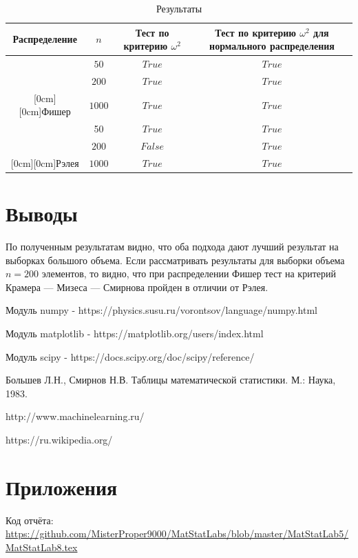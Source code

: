 \documentclass[a4]{article}
\begin{document}
\begin{table}[H]
\caption{Результаты}
\label{tab:my_label1}
\begin{center}
\vspace{5mm}
\begin{tabular}{|c|c|c|c|}
\hline
Распределение & $n$&Тест по критерию $\omega^2$ & Тест по критерию $\omega^2$ для нормального распределения \\
\hline
&$50$&	$True$&		$True$ \\
\cline{2-4}
&$200$&	$True$&		$True$ \\
\cline{2-4}
\raisebox{1.5ex}[0cm][0cm]{Фишер}&$1000$&	$True$&		$True$\\
\hline
&50&	$True$&		$True$ \\
\cline{2-4}
&$200$&	$False$&		$True$ \\
\cline{2-4}
\raisebox{1.5ex}[0cm][0cm]{Рэлея}&$1000$&	$True$&	$True$\\
\hline
\end{tabular}
\end{center}
\end{table}

\section{Выводы}

По полученным результатам видно, что оба подхода дают лучший результат на выборках большого объема. Если рассматривать результаты для выборки объема $n=200$ элементов, то видно, что при распределении Фишер тест на критерий Крамера — Мизеса — Смирнова пройден в отличии от Рэлея.

\begin{thebibliography}{}
      Модуль numpy  -  https://physics.susu.ru/vorontsov/language/numpy.html
    
    Модуль matplotlib - https://matplotlib.org/users/index.html
    
    Модуль scipy - https://docs.scipy.org/doc/scipy/reference/
    

Большев Л.Н., Смирнов Н.В. Таблицы математической статистики. М.: Наука, 1983.

http://www.machinelearning.ru/

https://ru.wikipedia.org/

\end{thebibliography}

\section{Приложения}


Код отчёта:\; \url{https://github.com/MisterProper9000/MatStatLabs/blob/master/MatStatLab5/MatStatLab8.tex}
\end{document}
